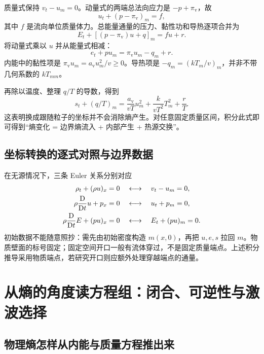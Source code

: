 质量式保持 $v_t-u_m=0$。动量式的两端总法向应力是 $-p+\pi_{\mathrm v}$，故
\begin{equation}
 \boxed{u_t+(p-\pi_{\mathrm v})_m=f,}\label{eq:lag-ns-momentum}
\end{equation}
其中 $f$ 是流向单位质量体力。总能量通量的压力、黏性功和导热逐项合并为
\begin{equation}
 \boxed{E_t+[(p-\pi_{\mathrm v})u+q]_m=fu+r.}\label{eq:lag-ns-energy}
\end{equation}
将动量式乘以 $u$ 并从能量式相减：
\begin{equation}
 \boxed{e_t+p u_m=\pi_{\mathrm v}u_m-q_m+r.}\label{eq:lag-ns-internal}
\end{equation}
内能中的黏性项是 $\pi_{\mathrm v}u_m=a_{\mathrm v}u_m^2/v\ge0$。导热项是 $-q_m=(kT_m/v)_m$，并非不带几何系数的 $kT_{mm}$。

再除以温度、整理 $q/T$ 的导数，得到
\begin{equation}
 \boxed{s_t+(q/T)_m
 =\frac{a_{\mathrm v}}{vT}u_m^2
 +\frac{k}{vT^2}T_m^2+\frac rT.}\label{eq:lag-ns-entropy}
\end{equation}
这表明换成跟随粒子的坐标并不会消除熵产生。对任意固定质量区间，积分此式即可得到“熵变化 = 边界熵流入 + 内部产生 + 热源交换”。

\subsection{坐标转换的逐式对照与边界数据}

在无源情况下，三条 Euler 关系分别对应
\begin{align}
 \rho_t+(\rho u)_x=0&\quad\longleftrightarrow\quad v_t-u_m=0,\\
 \rho\frac{\mathrm D}{\mathrm Dt} u+p_x=0&\quad\longleftrightarrow\quad u_t+p_m=0,\\
 \rho\frac{\mathrm D}{\mathrm Dt} E+(pu)_x=0&\quad\longleftrightarrow\quad E_t+(pu)_m=0.
\end{align}
初始数据不能随意照抄：需先由初始密度构造 $m(x,0)$，再把 $u,e,s$ 拉回 $m$。物质壁面的标号固定；固定空间开口一般有流体穿过，不是固定质量端点。上述积分推导采用物质端点，若研究开口则应额外处理穿越端点的通量。

\section{从熵的角度读方程组：闭合、可逆性与激波选择}\label{sec:entropy-three-views}

\subsection{物理熵怎样从内能与质量方程推出来}

